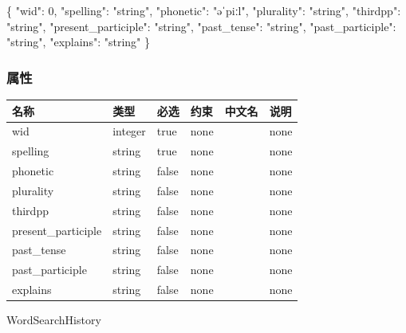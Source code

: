 \documentclass[
]{article}
\newenvironment{Shaded}{}{}
\newcommand{\DataTypeTok}[1]{\textcolor[rgb]{0.56,0.13,0.00}{#1}}
\newcommand{\DecValTok}[1]{\textcolor[rgb]{0.25,0.63,0.44}{#1}}
\newcommand{\FunctionTok}[1]{\textcolor[rgb]{0.02,0.16,0.49}{#1}}
\newcommand{\StringTok}[1]{\textcolor[rgb]{0.25,0.44,0.63}{#1}}
\begin{document}
\begin{Shaded}
\begin{Highlighting}[]
\FunctionTok{\{}
  \DataTypeTok{"wid"}\FunctionTok{:} \DecValTok{0}\FunctionTok{,}
  \DataTypeTok{"spelling"}\FunctionTok{:} \StringTok{"string"}\FunctionTok{,}
  \DataTypeTok{"phonetic"}\FunctionTok{:} \StringTok{"əˈpiːl"}\FunctionTok{,}
  \DataTypeTok{"plurality"}\FunctionTok{:} \StringTok{"string"}\FunctionTok{,}
  \DataTypeTok{"thirdpp"}\FunctionTok{:} \StringTok{"string"}\FunctionTok{,}
  \DataTypeTok{"present\_participle"}\FunctionTok{:} \StringTok{"string"}\FunctionTok{,}
  \DataTypeTok{"past\_tense"}\FunctionTok{:} \StringTok{"string"}\FunctionTok{,}
  \DataTypeTok{"past\_participle"}\FunctionTok{:} \StringTok{"string"}\FunctionTok{,}
  \DataTypeTok{"explains"}\FunctionTok{:} \StringTok{"string"}
\FunctionTok{\}}
\end{Highlighting}
\end{Shaded}

\hypertarget{ux5c5eux6027-16}{%
\subsubsection{属性}\label{ux5c5eux6027-16}}

\begin{longtable}[]{@{}llllll@{}}
\toprule
名称 & 类型 & 必选 & 约束 & 中文名 & 说明 \\
\midrule
\endhead
wid & integer & true & none & & none \\
spelling & string & true & none & & none \\
phonetic & string & false & none & & none \\
plurality & string & false & none & & none \\
thirdpp & string & false & none & & none \\
present\_participle & string & false & none & & none \\
past\_tense & string & false & none & & none \\
past\_participle & string & false & none & & none \\
explains & string & false & none & & none \\
\bottomrule
\end{longtable}

WordSearchHistory

\strut \\
\strut \\
\strut \\
\end{document}
